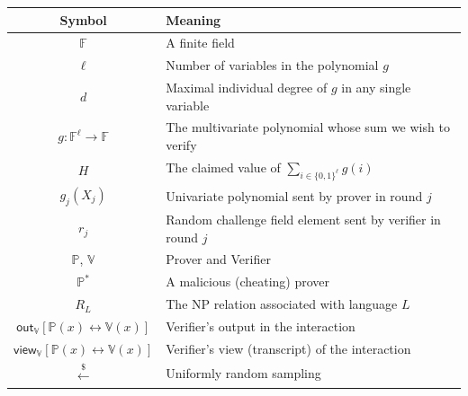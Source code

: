 \documentclass[11pt]{article}
\theoremstyle{plain}
\theoremstyle{definition}
\newcommand{\F}{\mathbb{F}}
\newcommand{\outV}{\mathsf{out}_\mathbb{V}}
\newcommand{\viewV}{\mathsf{view}_\mathbb{V}}
\begin{document}
\begin{center}
\begin{tabular}{cl}
  \hline
  \textbf{Symbol} & \textbf{Meaning} \\
  \hline
  $\F$ & A finite field \\
  $\ell$ & Number of variables in the polynomial $g$ \\
  $d$ & Maximal individual degree of $g$ in any single variable \\
  $g : \F^\ell \to \F$ & The multivariate polynomial whose sum we wish to verify \\
  $H$ & The claimed value of $\sum_{i \in \{0,1\}^\ell} g(i)$ \\
  $g_j(X_j)$ & Univariate polynomial sent by prover in round $j$ \\
  $r_j$ & Random challenge field element sent by verifier in round $j$ \\
  $\mathbb{P}$, $\mathbb{V}$ & Prover and Verifier \\
  $\mathbb{P}^*$ & A malicious (cheating) prover \\
  $R_L$ & The NP relation associated with language $L$ \\
  $\outV[\mathbb{P}(x) \leftrightarrow \mathbb{V}(x)]$ & Verifier's output in the interaction \\
  $\viewV[\mathbb{P}(x) \leftrightarrow \mathbb{V}(x)]$ & Verifier's view (transcript) of the interaction \\
  $\xleftarrow{\$}$ & Uniformly random sampling \\
  \hline
\end{tabular}
\end{center}
\end{document}
